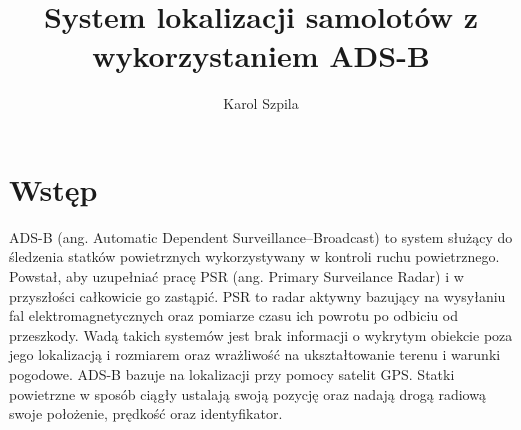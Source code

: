\documentclass[eng,printmode]{mgr}
\title{System lokalizacji samolotów z wykorzystaniem ADS-B}
\author{Karol Szpila}
\begin{document}

\maketitle %

\tableofcontents %

\let\cleardoublepage\clearpage %

\chapter{ Wstęp }
ADS-B (ang. Automatic Dependent Surveillance–Broadcast) to system służący do śledzenia statków powietrznych wykorzystywany w kontroli ruchu powietrznego. Powstał, aby uzupełniać pracę PSR (ang. Primary Surveilance Radar) i w przyszłości całkowicie go zastąpić. PSR to radar aktywny bazujący na wysyłaniu fal elektromagnetycznych oraz pomiarze czasu ich powrotu po odbiciu od przeszkody. Wadą takich systemów jest brak informacji o wykrytym obiekcie poza jego lokalizacją i rozmiarem oraz wrażliwość na ukształtowanie terenu i warunki pogodowe. ADS-B bazuje na lokalizacji przy pomocy satelit GPS. Statki powietrzne w sposób ciągły ustalają swoją pozycję oraz nadają drogą radiową swoje położenie, prędkość oraz identyfikator.
\\
\end{document}
